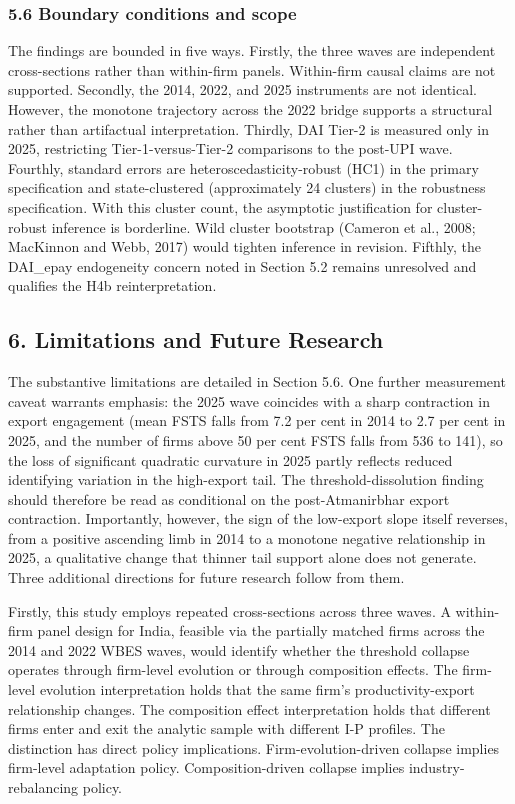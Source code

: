 \documentclass[
  12pt,a4paper]{article}
\begin{document}
\hypertarget{boundary-conditions-and-scope}{%
\subsubsection{5.6 Boundary conditions and
scope}\label{boundary-conditions-and-scope}}

The findings are bounded in five ways. Firstly, the three waves are
independent cross-sections rather than within-firm panels. Within-firm
causal claims are not supported. Secondly, the 2014, 2022, and 2025
instruments are not identical. However, the monotone trajectory across
the 2022 bridge supports a structural rather than artifactual
interpretation. Thirdly, DAI Tier-2 is measured only in 2025,
restricting Tier-1-versus-Tier-2 comparisons to the post-UPI wave.
Fourthly, standard errors are heteroscedasticity-robust (HC1) in the
primary specification and state-clustered (approximately 24 clusters) in
the robustness specification. With this cluster count, the asymptotic
justification for cluster-robust inference is borderline. Wild cluster
bootstrap (Cameron et al., 2008; MacKinnon and Webb, 2017) would tighten
inference in revision. Fifthly, the DAI\_epay endogeneity concern noted
in Section 5.2 remains unresolved and qualifies the H4b
reinterpretation.

\hypertarget{limitations-and-future-research}{%
\subsection{6. Limitations and Future
Research}\label{limitations-and-future-research}}

The substantive limitations are detailed in Section 5.6. One further
measurement caveat warrants emphasis: the 2025 wave coincides with a
sharp contraction in export engagement (mean FSTS falls from 7.2 per
cent in 2014 to 2.7 per cent in 2025, and the number of firms above 50
per cent FSTS falls from 536 to 141), so the loss of significant
quadratic curvature in 2025 partly reflects reduced identifying
variation in the high-export tail. The threshold-dissolution finding
should therefore be read as conditional on the post-Atmanirbhar export
contraction. Importantly, however, the sign of the low-export slope
itself reverses, from a positive ascending limb in 2014 to a monotone
negative relationship in 2025, a qualitative change that thinner tail
support alone does not generate. Three additional directions for future
research follow from them.

Firstly, this study employs repeated cross-sections across three waves.
A within-firm panel design for India, feasible via the partially matched
firms across the 2014 and 2022 WBES waves, would identify whether the
threshold collapse operates through firm-level evolution or through
composition effects. The firm-level evolution interpretation holds that
the same firm's productivity-export relationship changes. The
composition effect interpretation holds that different firms enter and
exit the analytic sample with different I-P profiles. The distinction
has direct policy implications. Firm-evolution-driven collapse implies
firm-level adaptation policy. Composition-driven collapse implies
industry-rebalancing policy.
\end{document}
